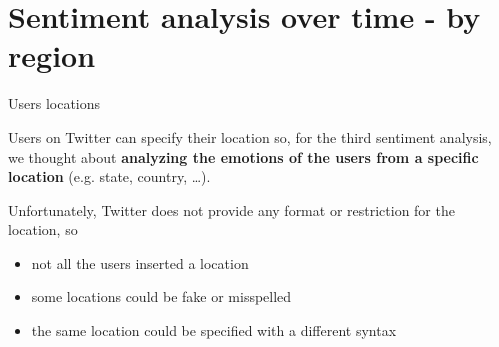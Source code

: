 \documentclass[8pt]{beamer}  %
\begin{document}
\section{Sentiment analysis over time - by region}
\begin{frame}{Users locations}
    
    Users on Twitter can specify their location so, for the third sentiment analysis, we thought about \textbf{analyzing the emotions of the users from a specific location} (e.g. state, country, \ldots).
    
    Unfortunately, Twitter does not provide any format or restriction for the location, so
    \begin{itemize}
        \item not all the users inserted a location
        \item some locations could be fake or misspelled
        \item the same location could be specified with a different syntax
    \end{itemize}
    
\end{frame}
\end{document}
